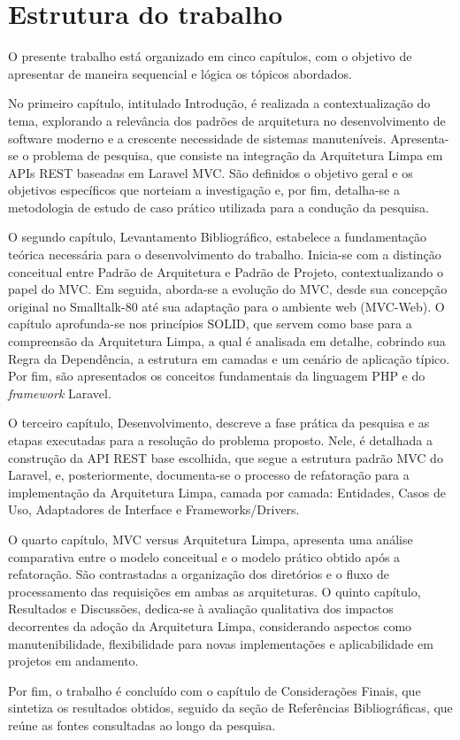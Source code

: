     \section{Estrutura do trabalho}
        \par O presente trabalho está organizado em cinco capítulos, com o objetivo de apresentar de maneira sequencial e lógica os tópicos abordados. 
    
        \par No primeiro capítulo, intitulado Introdução, é realizada a contextualização do tema, explorando a relevância dos padrões de arquitetura no desenvolvimento de software moderno e a crescente necessidade de sistemas manuteníveis. Apresenta-se o problema de pesquisa, que consiste na integração da Arquitetura Limpa em APIs REST baseadas em Laravel MVC. São definidos o objetivo geral e os objetivos específicos que norteiam a investigação e, por fim, detalha-se a metodologia de estudo de caso prático utilizada para a condução da pesquisa. 
    
        \par O segundo capítulo, Levantamento Bibliográfico, estabelece a fundamentação teórica necessária para o desenvolvimento do trabalho. Inicia-se com a distinção conceitual entre Padrão de Arquitetura e Padrão de Projeto, contextualizando o papel do MVC. Em seguida, aborda-se a evolução do MVC, desde sua concepção original no Smalltalk-80 até sua adaptação para o ambiente web (MVC-Web). O capítulo aprofunda-se nos princípios SOLID, que servem como base para a compreensão da Arquitetura Limpa, a qual é analisada em detalhe, cobrindo sua Regra da Dependência, a estrutura em camadas e um cenário de aplicação típico. Por fim, são apresentados os conceitos fundamentais da linguagem PHP e do \textit{framework} Laravel. 
    
        \par O terceiro capítulo, Desenvolvimento, descreve a fase prática da pesquisa e as etapas executadas para a resolução do problema proposto. Nele, é detalhada a construção da API REST base escolhida, que segue a estrutura padrão MVC do Laravel, e, posteriormente, documenta-se o processo de refatoração para a implementação da Arquitetura Limpa, camada por camada: Entidades, Casos de Uso, Adaptadores de Interface e Frameworks/Drivers. 

        \par O quarto capítulo, MVC versus Arquitetura Limpa, apresenta uma análise comparativa entre o modelo conceitual e o modelo prático obtido após a refatoração. São contrastadas a organização dos diretórios e o fluxo de processamento das requisições em ambas as arquiteturas. O quinto capítulo, Resultados e Discussões, dedica-se à avaliação qualitativa dos impactos decorrentes da adoção da Arquitetura Limpa, considerando aspectos como manutenibilidade, flexibilidade para novas implementações e aplicabilidade em projetos em andamento.

        \par Por fim, o trabalho é concluído com o capítulo de Considerações Finais, que sintetiza os resultados obtidos, seguido da seção de Referências Bibliográficas, que reúne as fontes consultadas ao longo da pesquisa.